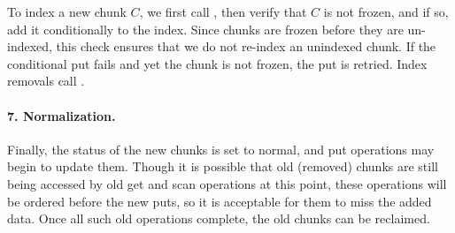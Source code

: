 To index a new chunk $C$, we first call , then verify that $C$ is not frozen, and if so,
add it conditionally to the index. 
Since chunks are frozen before they are un-indexed, this check ensures that we do not re-index an unindexed chunk.
If the conditional put fails and yet the chunk is not frozen, the put is retried.
Index removals call .

\paragraph{7. Normalization.}
Finally, the status of the new chunks is set to normal, and put operations may begin to update them.
Though it is possible that old (removed) chunks are still being accessed by old get and scan operations at this point, these operations will
be ordered before the new puts, so it is acceptable for them to miss the added data. Once all such old operations complete, the
old chunks can be reclaimed.

